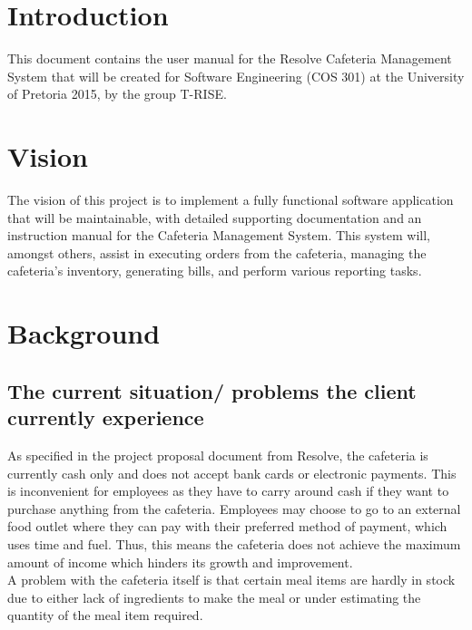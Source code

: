 \documentclass[a4paper,12pt]{report}
\begin{document}
\section{Introduction} 
This document contains the user manual for the Resolve Cafeteria Management System that will be created for Software Engineering (COS 301) at the University of Pretoria 2015, by the group T-RISE.

\section{Vision}
The vision of this project is to implement a fully functional software application that will be maintainable, with detailed supporting documentation and an instruction manual for the Cafeteria Management System. This system will, amongst others, assist in executing orders from the cafeteria, managing the cafeteria's inventory, generating bills, and perform various reporting tasks. 

\section{Background}
\subsection{The current situation/ problems the client currently experience}
As specified in the project proposal document from Resolve, the cafeteria is currently cash only and does not accept bank cards or electronic payments. This is inconvenient for employees as they have to carry around cash if they want to purchase anything from the cafeteria. Employees may choose to go to an external food outlet where they can pay with their preferred method of payment, which uses time and fuel. Thus, this means the cafeteria does not achieve the maximum amount of income which hinders its growth and improvement.\\ A problem with the cafeteria itself is that certain meal items are hardly in stock due to either lack of ingredients to make the meal or under estimating the quantity of the meal item required.
\end{document}
